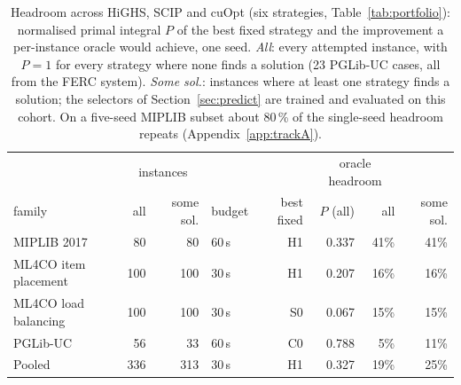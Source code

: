 \begin{table}[t]\centering\small
\begin{tabular}{lrrlrrrr}
\toprule
 & \multicolumn{2}{c}{instances} & & & \multicolumn{2}{c}{oracle headroom} \\
family & all & some sol. & budget & best fixed & $P$ (all) & all & some sol. \\
\midrule
MIPLIB 2017 & 80 & 80 & 60\,s & H1 & 0.337 & 41\% & 41\% \\
ML4CO item placement & 100 & 100 & 30\,s & H1 & 0.207 & 16\% & 16\% \\
ML4CO load balancing & 100 & 100 & 30\,s & S0 & 0.067 & 15\% & 15\% \\
PGLib-UC & 56 & 33 & 60\,s & C0 & 0.788 & 5\% & 11\% \\
Pooled & 336 & 313 & 30\,s & H1 & 0.327 & 19\% & 25\% \\
\bottomrule
\end{tabular}
\caption{Headroom across HiGHS, SCIP and cuOpt (six strategies, Table~\ref{tab:portfolio}): normalised primal integral $P$ of the best fixed strategy and the improvement a per-instance oracle would achieve, one seed. \emph{All}: every attempted instance, with $P=1$ for every strategy where none finds a solution (23 PGLib-UC cases, all from the FERC system). \emph{Some sol.}: instances where at least one strategy finds a solution; the selectors of Section~\ref{sec:predict} are trained and evaluated on this cohort. On a five-seed MIPLIB subset about 80\,\% of the single-seed headroom repeats (Appendix~\ref{app:trackA}).}\label{tab:headroom}
\end{table}